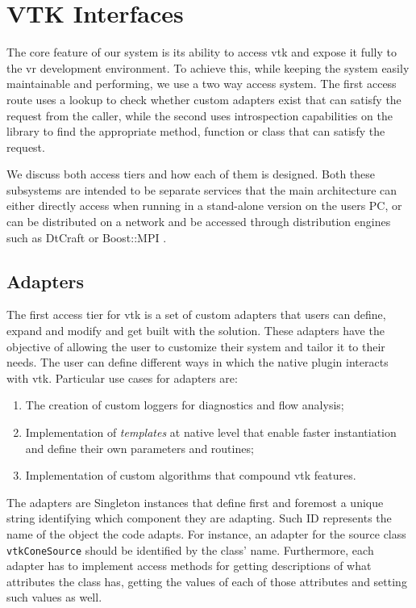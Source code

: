 \section{VTK Interfaces}
\label{sec:design-interfaces}

The core feature of our system is its ability to access \acrshort{vtk} and expose it fully to the \acrshort{vr} development environment. To achieve this, while keeping the system easily maintainable and performing, we use a two way access system. The first access route uses a lookup to check whether custom adapters exist that can satisfy the request from the caller, while the second uses introspection capabilities on the library to find the appropriate method, function or class that can satisfy the request.

We discuss both access tiers and how each of them is designed. Both these subsystems are intended to be separate services that the main architecture can either directly access when running in a stand-alone version on the users PC, or can be distributed on a network and be accessed through distribution engines such as DtCraft \cite{huang2017dtcraft} or Boost::MPI \cite{schaling2011boost}.

\subsection{Adapters}
\label{sec:design-adapters}

The first access tier for \acrshort{vtk} is a set of custom adapters that users can define, expand and modify and get built with the solution. These adapters have the objective of allowing the user to customize their system and tailor it to their needs. The user can define different ways in which the native plugin interacts with \acrshort{vtk}. Particular use cases for adapters are:

\begin{enumerate}
    \item The creation of custom loggers for diagnostics and flow analysis;
    \item Implementation of \textit{templates} at native level that enable faster instantiation and define their own parameters and routines;
    \item Implementation of custom algorithms that compound \acrshort{vtk} features.
\end{enumerate}

The adapters are Singleton instances that define first and foremost a unique string identifying which component they are adapting. Such ID represents the name of the object the code adapts. For instance, an adapter for the  source class \verb|vtkConeSource| should be identified by the class' name. Furthermore, each adapter has to implement access methods for getting descriptions of what attributes the class has, getting the values of each of those attributes and setting such values as well. 

